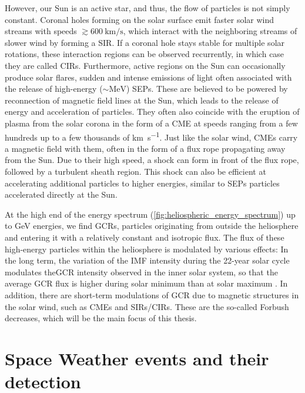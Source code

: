 However, our Sun is an active star, and thus, the flow of particles is not simply constant.
Coronal holes forming on the solar surface emit faster solar wind streams with speeds $\gtrsim \SI{600}{\kilo\meter\per\second}$, which interact with the neighboring streams of slower wind by forming a \ac{SIR}. If a coronal hole stays stable for multiple solar rotations, these interaction regions can be observed recurrently, in which case they are called \acp{CIR}.
Furthermore, active regions on the Sun can occasionally produce solar flares, sudden and intense emissions of light often associated with the release of high-energy ($\sim \si{\mega\electronvolt}$) \acp{SEP}.
These are believed to be powered by reconnection of magnetic field lines at the Sun, which leads to the release of energy and acceleration of particles.
They often also coincide with the eruption of plasma from the solar corona in the form of a \ac{CME} at speeds ranging from a few hundreds up to a few thousands of \si{\kilo\meter\per\second}.
Just like the solar wind, \acp{CME} carry a magnetic field with them, often in the form of a flux rope propagating away from the Sun. Due to their high speed, a shock can form in front of the flux rope, followed by a turbulent sheath region.
This shock can also be efficient at accelerating additional particles to higher energies, similar to \acp{SEP} particles accelerated directly at the Sun.

At the high end of the energy spectrum (\autoref{fig:heliospheric_energy_spectrum}) up to \si{\giga\electronvolt} energies, we find \acp{GCR}, particles originating from outside the heliosphere and entering it with a relatively constant and isotropic flux. 
The flux of these high-energy particles within the heliosphere is modulated by various effects: In the long term, the variation of the \ac{IMF} intensity during the 22-year solar cycle modulates the\ac{GCR} intensity observed in the inner solar system, so that the average \ac{GCR} flux is higher during solar minimum than at solar maximum \citep{Fisk-1980}. In addition, there are short-term modulations of \ac{GCR} due to magnetic structures in the solar wind, such as \acp{CME} and \acp{SIR}/\acp{CIR}. These are the so-called Forbush decreases, which will be the main focus of this thesis.

\section{Space Weather events and their detection}
\label{sec:spaceweather}


